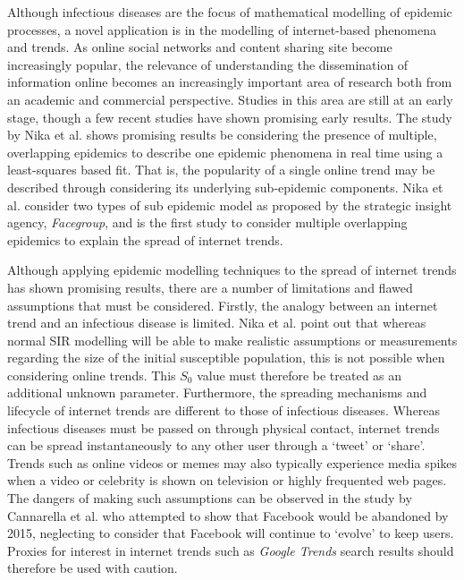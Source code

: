 \documentclass[11pt, a4paper, oneside,titlepage]{article}
\begin{document}
Although infectious diseases are the focus of mathematical modelling
of epidemic processes, a novel application is in the modelling of
internet-based phenomena and trends. As online social networks and
content sharing site become increasingly popular, the relevance of
understanding the dissemination of information online becomes an
increasingly important area of research both from an academic and
commercial perspective.\cite{cannarella, facebook} Studies in this
area are still at an early stage, though a few recent studies have
shown promising early results. \cite{marily2013, marily2014, bieber}
The study by Nika et al. shows promising results be considering the
presence of multiple, overlapping epidemics to describe one epidemic
phenomena in real time using a least-squares based fit. That is, the
popularity of a single online trend may be described through
considering its underlying sub-epidemic components. Nika et
al. consider two types of sub epidemic model as proposed by the
strategic insight agency, \emph{Facegroup}, and is the first study to
consider multiple overlapping epidemics to explain the spread of
internet trends. 

Although applying epidemic modelling techniques to the spread of
internet trends has shown promising results, there are a number of
limitations and flawed assumptions that must be considered. Firstly,
the analogy between an internet trend and an infectious disease is
limited. Nika et al. point out that whereas normal SIR modelling will
be able to make realistic assumptions or measurements regarding the
size of the initial susceptible population, this is not possible when
considering online trends. This $S_0$ value must therefore be treated
as an additional unknown parameter.\cite{marily2013} Furthermore, the
spreading mechanisms and lifecycle of internet trends are different to
those of infectious diseases. Whereas infectious diseases must be
passed on through physical contact, internet trends can be spread
instantaneously to any other user through a `tweet' or `share'. Trends
such as online videos or memes may also typically experience media
spikes when a video or celebrity is shown on television or highly
frequented web pages. The dangers of making such assumptions can be
observed in the study by Cannarella et al. who attempted to show that
Facebook would be abandoned by 2015, neglecting to consider that
Facebook will continue to `evolve' to keep users.\cite{cannarella,
  facebook} Proxies for interest in internet trends such as
\emph{Google Trends} search results should therefore be used with
caution.
\end{document}
